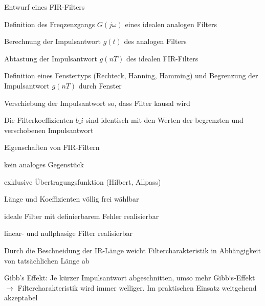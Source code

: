 \documentclass[a4paper]{article}
\begin{document}
\begin{multicols}{3}
  Entwurf eines FIR-Filters
  \begin{enumerate*}
    \item Definition des Freqzenzgangs $G(j\omega)$ eines idealen analogen Filters
    \item Berechnung der Impulsantwort $g(t)$ des analogen Filters
    \item Abtastung der Impulsantwort $g(nT)$ des idealen FIR-Filters
    \item Definition eines Fenstertyps (Rechteck, Hanning, Hamming) und Begrenzung der Impulsantwort $g(nT)$ durch Fenster
    \item Verschiebung der Impulsantwort so, dass Filter kausal wird
    \item Die Filterkoeffizienten $b\_i$ sind identisch mit den Werten der begrenzten und verschobenen Impulsantwort
  \end{enumerate*}

  Eigenschaften von FIR-Filtern
  \begin{itemize*}
    \item kein analoges Gegenstück
    \item exklusive Übertragungsfunktion (Hilbert, Allpass)
    \item Länge und Koeffizienten völlig frei wählbar
    \item ideale Filter mit definierbarem Fehler realisierbar
    \item linear- und nullphasige Filter realisierbar
    \item Durch die Beschneidung der IR-Länge weicht Filtercharakteristik in Abhängigkeit von tatsächlichen Länge ab
    \item Gibb's Effekt: Je kürzer Impulsantwort abgeschnitten, umso mehr Gibb`s-Effekt$\rightarrow$ Filtercharakteristik wird immer welliger. Im praktischen Einsatz weitgehend akzeptabel
  \end{itemize*}


\end{multicols}
\end{document}
